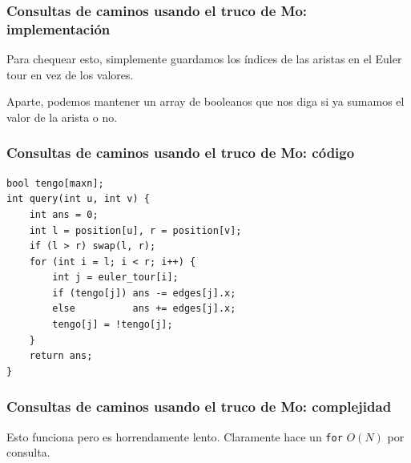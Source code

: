 \begin{frame}
  \frametitle{Consultas de caminos usando el truco de Mo: implementación}

  Para chequear esto, simplemente guardamos los índices de las aristas en el Euler tour en vez de los valores.

  \vspace{0.75em}

  Aparte, podemos mantener un array de booleanos que nos diga si ya sumamos el valor de la arista o no.
\end{frame}

\begin{frame}[fragile]
  \frametitle{Consultas de caminos usando el truco de Mo: código}

\begin{lstlisting}
bool tengo[maxn];
int query(int u, int v) {
    int ans = 0;
    int l = position[u], r = position[v];
    if (l > r) swap(l, r);
    for (int i = l; i < r; i++) {
        int j = euler_tour[i];
        if (tengo[j]) ans -= edges[j].x;
        else          ans += edges[j].x;
        tengo[j] = !tengo[j];
    }
    return ans;
}
\end{lstlisting}
\end{frame}

\begin{frame}
  \frametitle{Consultas de caminos usando el truco de Mo: complejidad}

  Esto funciona pero es horrendamente lento. Claramente hace un \texttt{for} \(O(N)\) por consulta.
\end{frame}
